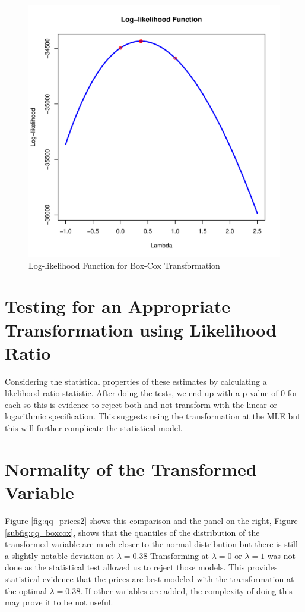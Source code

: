 \begin{figure}[h!]
  \centering
  \includegraphics[scale = 0.5, keepaspectratio=true]{../Figures/box_cox_loglike_uni}
  \caption{Log-likelihood Function for Box-Cox Transformation} \label{fig:box_cox_loglike_uni}
\end{figure}


\pagebreak
\section*{Testing for an Appropriate Transformation using Likelihood Ratio}

Considering the statistical properties of these estimates
by calculating a likelihood ratio statistic. After doing the tests, 
we end up with a p-value of 0 for each so this is evidence to reject 
both and not transform with the linear or logarithmic specification.
This suggests using the transformation at the MLE but this will further 
complicate the statistical model.


\section*{Normality of the Transformed Variable}

Figure \ref{fig:qq_prices2} shows this comparison
and the panel on the right, Figure \ref{subfig:qq_boxcox}, 
shows that the quantiles of the distribution of the transformed variable
are much closer to the normal distribution but there is still a slightly notable deviation 
at $\lambda = 0.38$
Transforming at $\lambda = 0$ or $\lambda = 1$ 
was not done as the statistical test allowed us to reject those models.%
This provides statistical evidence that the prices are best modeled with the transformation
at the optimal $\lambda = 0.38$.
If other variables are added, the complexity of doing this may prove it to be not useful.


